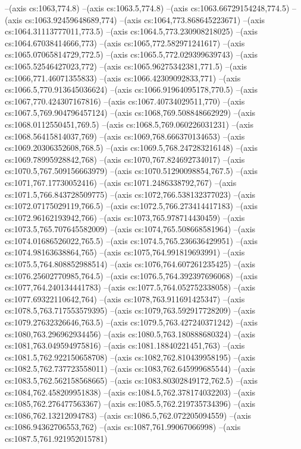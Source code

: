 --(axis cs:1063,774.8)
--(axis cs:1063.5,774.8)
--(axis cs:1063.66729154248,774.5)
--(axis cs:1063.92459648689,774)
--(axis cs:1064,773.868645223671)
--(axis cs:1064.31113777011,773.5)
--(axis cs:1064.5,773.230908218025)
--(axis cs:1064.67038414666,773)
--(axis cs:1065,772.582971241617)
--(axis cs:1065.07065814729,772.5)
--(axis cs:1065.5,772.029399639743)
--(axis cs:1065.52546427023,772)
--(axis cs:1065.96275342381,771.5)
--(axis cs:1066,771.46071355833)
--(axis cs:1066.42309092833,771)
--(axis cs:1066.5,770.913645036624)
--(axis cs:1066.91964095178,770.5)
--(axis cs:1067,770.424307167816)
--(axis cs:1067.40734029511,770)
--(axis cs:1067.5,769.904796457124)
--(axis cs:1068,769.508848662929)
--(axis cs:1068.0112550451,769.5)
--(axis cs:1068.5,769.060226031231)
--(axis cs:1068.56415814037,769)
--(axis cs:1069,768.666370134653)
--(axis cs:1069.20306352608,768.5)
--(axis cs:1069.5,768.247283216148)
--(axis cs:1069.78995928842,768)
--(axis cs:1070,767.824692734017)
--(axis cs:1070.5,767.509156663979)
--(axis cs:1070.51290098854,767.5)
--(axis cs:1071,767.17730052416)
--(axis cs:1071.2486338792,767)
--(axis cs:1071.5,766.843728509775)
--(axis cs:1072,766.538132377023)
--(axis cs:1072.07175029119,766.5)
--(axis cs:1072.5,766.273414417183)
--(axis cs:1072.96162193942,766)
--(axis cs:1073,765.978714430459)
--(axis cs:1073.5,765.707645582009)
--(axis cs:1074,765.508668581964)
--(axis cs:1074.01686526022,765.5)
--(axis cs:1074.5,765.236636429951)
--(axis cs:1074.98163638864,765)
--(axis cs:1075,764.991819693991)
--(axis cs:1075.5,764.808852988514)
--(axis cs:1076,764.607261235425)
--(axis cs:1076.25602770985,764.5)
--(axis cs:1076.5,764.392397696068)
--(axis cs:1077,764.240134441783)
--(axis cs:1077.5,764.052752338058)
--(axis cs:1077.69322110642,764)
--(axis cs:1078,763.911691425347)
--(axis cs:1078.5,763.717553579395)
--(axis cs:1079,763.592917728209)
--(axis cs:1079.27632326646,763.5)
--(axis cs:1079.5,763.427240371242)
--(axis cs:1080,763.296962934456)
--(axis cs:1080.5,763.180888680324)
--(axis cs:1081,763.049594975816)
--(axis cs:1081.18840221451,763)
--(axis cs:1081.5,762.922150658708)
--(axis cs:1082,762.810439958195)
--(axis cs:1082.5,762.737723558011)
--(axis cs:1083,762.645999685544)
--(axis cs:1083.5,762.562158568665)
--(axis cs:1083.80302849172,762.5)
--(axis cs:1084,762.458209951838)
--(axis cs:1084.5,762.378174032203)
--(axis cs:1085,762.276477563367)
--(axis cs:1085.5,762.219735734396)
--(axis cs:1086,762.13212094783)
--(axis cs:1086.5,762.072205094559)
--(axis cs:1086.94362706553,762)
--(axis cs:1087,761.99067066998)
--(axis cs:1087.5,761.921952015781)
